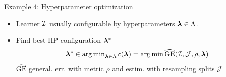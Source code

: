 \documentclass[11pt,compress,t,notes=noshow, xcolor=table]{beamer}
\begin{document}
\begin{vbframe}{Example 4: Hyperparameter optimization}

\begin{itemize}
	\item Learner $\mathcal{I}$ usually configurable by hyperparameters $\bm{\lambda} \in \Lambda$. 
	\item Find best HP configuration $\bm{\lambda}^\ast$ 
	$$
	\bm{\lambda}^\ast \in \operatorname{arg\,min}\nolimits_{\bm{\lambda} \in \Lambda} c(\bm{\lambda}) = \operatorname{arg\,min} \widehat{\text{GE}}(\mathcal{I}, \mathcal{J}, \rho, \bm{\lambda})
	$$
	$\widehat{\text{GE}}$ general. err. with metric $\rho$ and estim. with resampling splits $\mathcal{J}$ 
\end{itemize}

\vspace*{-0.2cm}

\begin{columns}
\begin{column}{0.6\textwidth}


\end{column}
\end{columns}
\end{vbframe}
\end{document}
